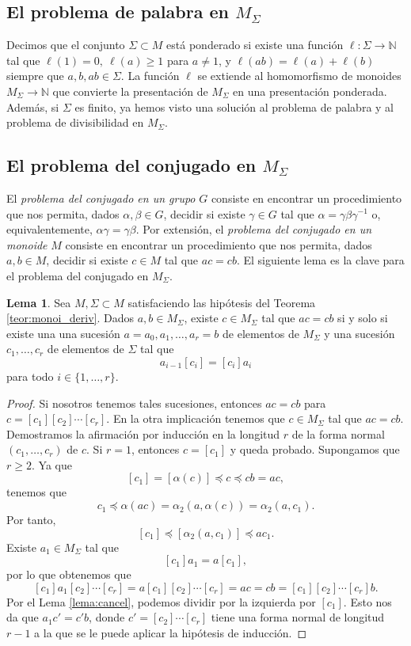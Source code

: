 \documentclass[12pt]{book}
\theoremstyle{definition}
\newtheorem{lema}{Lema}[section]
\begin{document}
\subsection{El problema de palabra en $M_\Sigma$}

Decimos que el conjunto $\Sigma\subset M$ está ponderado si existe una función $\ell:\Sigma\rightarrow\mathbb{N}$ tal que $\ell(1)=0,\ \ell(a)\geq 1$ para $a\neq 1$, y $\ell(ab)=\ell(a)+\ell(b)$ siempre que $a,b,ab\in\Sigma$. La función $\ell$ se extiende al homomorfismo de monoides $M_\Sigma\rightarrow\mathbb{N}$ que convierte la presentación de $M_\Sigma$ en una presentación ponderada. Además, si $\Sigma$ es finito, ya hemos visto una solución al problema de palabra y al problema de divisibilidad en $M_\Sigma$.

\subsection{El problema del conjugado en $M_\Sigma$}
\label{sec:pc_msigma}
El \textit{problema del conjugado en un grupo} $G$ consiste en encontrar un procedimiento que nos permita, dados $\alpha,\beta\in G$, decidir si existe $\gamma\in G$ tal que $\alpha=\gamma\beta\gamma^{-1}$ o, equivalentemente, $\alpha\gamma=\gamma\beta$. Por extensión, el \textit{problema del conjugado en un monoide} $M$ consiste en encontrar un procedimiento que nos permita, dados $a,b\in M$, decidir si existe $c\in M$ tal que $ac=cb$. El siguiente lema es la clave para el problema del conjugado en $M_\Sigma$.

\begin{lema}
Sea $M,\Sigma\subset M$ satisfaciendo las hipótesis del Teorema \ref{teor:monoi_deriv}. Dados $a,b\in M_\Sigma$, existe $c\in M_\Sigma$ tal que $ac=cb$ si y solo si existe una una sucesión $a=a_0,a_1,\ldots,a_r=b$ de elementos de $M_\Sigma$ y una sucesión $c_1,\ldots,c_r$ de elementos de $\Sigma$ tal que
$$a_{i-1}[c_i]=[c_i]a_i$$
para todo $i\in\{1,\ldots,r\}$.

\label{lema:conjugado}
\end{lema}

\begin{proof} Si nosotros tenemos tales sucesiones, entonces $ac=cb$ para $c=[c_1][c_2]\cdots[c_r]$. En la otra implicación tenemos que $c\in M_\Sigma$ tal que $ac=cb$. Demostramos la afirmación por inducción en la longitud $r$ de la forma normal $(c_1,\ldots,c_r)$ de $c$. Si $r=1$, entonces $c = [c_1]$ y queda probado. Supongamos que $r\geq 2$. Ya que
$$[c_1]=[\alpha(c)]\preceq c \preceq cb = ac,$$
tenemos que
$$c_1\preceq\alpha(ac)=\alpha_2(a,\alpha(c))=\alpha_2(a,c_1).$$
Por tanto,
$$[c_1]\preceq [\alpha_2(a,c_1)]\preceq ac_1.$$
Existe $a_1\in M_\Sigma$ tal que
$$[c_1]a_1=a[c_1],$$
por lo que obtenemos que 
$$[c_1]a_1[c_2]\cdots[c_r]=a[c_1][c_2]\cdots[c_r]=ac=cb=[c_1][c_2]\cdots[c_r]b.$$
Por el Lema \ref{lema:cancel}, podemos dividir por la izquierda por $[c_1]$. Esto nos da que $a_1c'=c'b$, donde $c'=[c_2]\cdots[c_r]$ tiene una forma normal de longitud $r-1$ a la que se le puede aplicar la hipótesis de inducción.
\end{proof}
\end{document}
